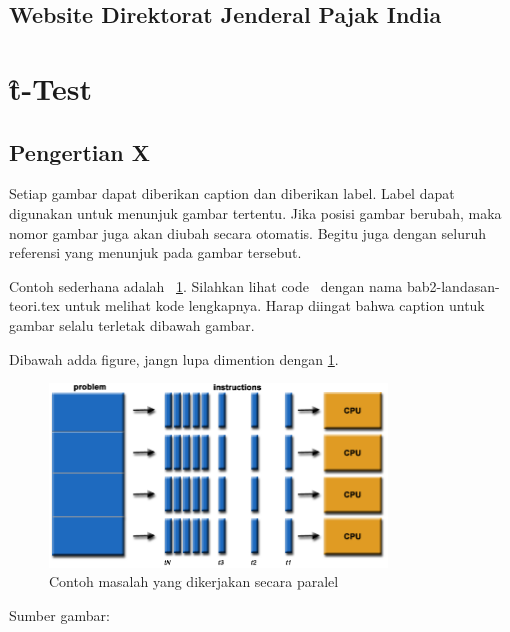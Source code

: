 \subsection{Website Direktorat Jenderal Pajak India}
\section{\f{t-Test}}

\subsection{Pengertian X}
Setiap gambar dapat diberikan caption dan diberikan label. Label dapat digunakan untuk menunjuk gambar tertentu. Jika posisi gambar berubah, maka nomor gambar juga akan diubah secara 
otomatis. Begitu juga dengan seluruh referensi yang menunjuk pada gambar tersebut. 

Contoh sederhana adalah \pic~\ref{fig:exmasalahparalel}. Silahkan lihat code \latex~dengan nama bab2-landasan-teori.tex untuk melihat kode lengkapnya. Harap diingat bahwa caption untuk gambar selalu terletak dibawah gambar. 

Dibawah adda figure, jangn lupa dimention dengan \ref{fig:exmasalahparalel}. 

\begin{figure}
	\centering
	\includegraphics[width=0.8\textwidth]
		{pics/parallelProblem.png}
	\caption{Contoh masalah yang dikerjakan secara paralel}
	\label{fig:exmasalahparalel}
\end{figure}
\vspace{-0.8cm}
\begin{center}
{\small Sumber gambar: \citep{net.oxford}}
\end{center}

